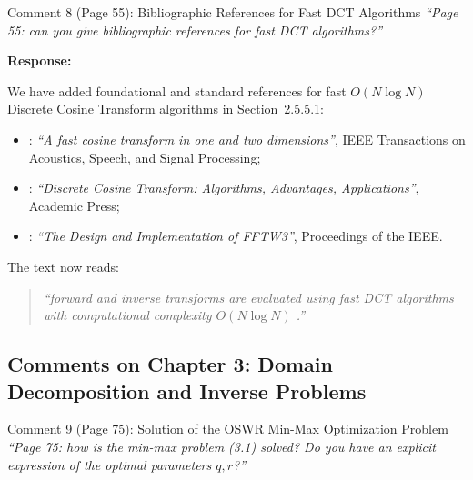 \documentclass[11pt,a4paper]{article}
\newenvironment{response}{
    \par\vspace{1mm}\noindent\textbf{\textcolor{responseframe}{Response:}}\par\vspace{1mm}
}{
    \par\vspace{3mm}
}
\begin{document}
\vspace{2mm}
\begin{revcomment}{Comment 8 (Page 55): Bibliographic References for Fast DCT Algorithms}
\emph{``Page 55: can you give bibliographic references for fast DCT algorithms?''}
\end{revcomment}

\begin{response}
We have added foundational and standard references for fast $O(N \log N)$ Discrete Cosine Transform algorithms in Section~2.5.5.1:
\begin{itemize}[leftmargin=*]
    \item \citet{makhoul_fast_1980}: \emph{``A fast cosine transform in one and two dimensions''}, IEEE Transactions on Acoustics, Speech, and Signal Processing;
    \item \citet{rao_discrete_1990}: \emph{``Discrete Cosine Transform: Algorithms, Advantages, Applications''}, Academic Press;
    \item \citet{frigo_design_2005}: \emph{``The Design and Implementation of FFTW3''}, Proceedings of the IEEE.
\end{itemize}
The text now reads:
\begin{quote}
\emph{``forward and inverse transforms are evaluated using fast DCT algorithms with computational complexity $O(N\log N)$ \cite{makhoul_fast_1980,rao_discrete_1990,frigo_design_2005}.''}
\end{quote}
\end{response}

\subsection{Comments on Chapter 3: Domain Decomposition and Inverse Problems}

\begin{revcomment}{Comment 9 (Page 75): Solution of the OSWR Min-Max Optimization Problem}
\emph{``Page 75: how is the min-max problem (3.1) solved? Do you have an explicit expression of the optimal parameters $q, r$?''}
\end{revcomment}
\end{document}
